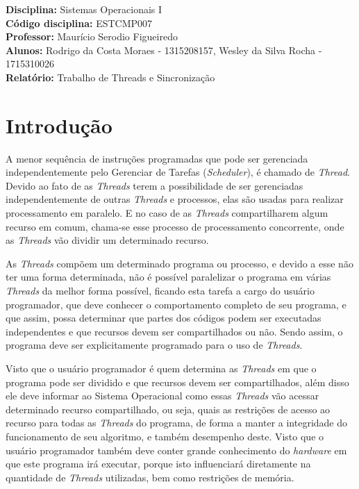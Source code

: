 \documentclass[a4paper, 11pt]{article}
\begin{document}
\noindent
\large\textbf{Disciplina: }Sistemas Operacionais I\\
\normalsize \textbf{Código disciplina: }ESTCMP007 \\
\textbf{Professor: }Maurício Serodio Figueiredo \\
\textbf{Alunos: }Rodrigo da Costa Moraes - 1315208157, Wesley da Silva Rocha - 1715310026 \\
\textbf{Relatório: }\large Trabalho de Threads e Sincronização

\section{Introdução}
A menor sequência de instruções programadas que pode ser gerenciada independentemente pelo Gerenciar de Tarefas (\textit{Scheduler}), é chamado de \textit{Thread}. Devido ao fato de as \textit{Threads} terem a possibilidade de ser gerenciadas independentemente de outras \textit{Threads} e processos, elas são usadas para realizar processamento em paralelo. E no caso de as \textit{Threads} compartilharem algum recurso em comum, chama-se esse processo de processamento concorrente, onde as \textit{Threads} vão dividir um determinado recurso.

As \textit{Threads} compõem um determinado programa ou processo, e devido a esse não ter uma forma determinada, não é possível paralelizar o programa em várias \textit{Threads} da melhor forma possível, ficando esta tarefa a cargo do usuário programador, que deve conhecer o comportamento completo de seu programa, e que assim, possa determinar que partes dos códigos podem ser executadas independentes e que recursos devem ser compartilhados ou não. Sendo assim, o programa deve ser explicitamente programado para o uso de \textit{Threads}.

Visto que o usuário programador é quem determina as \textit{Threads} em que o programa pode ser dividido e que recursos devem ser compartilhados, além disso ele deve informar ao Sistema Operacional como essas \textit{Threads} vão acessar determinado recurso compartilhado, ou seja, quais as restrições de acesso ao recurso para todas as \textit{Threads} do programa, de forma a manter a integridade do funcionamento de seu algoritmo, e também desempenho deste. Visto que o usuário programador também deve conter grande conhecimento do \textit{hardware} em que este programa irá executar, porque isto influenciará diretamente na quantidade de \textit{Threads} utilizadas, bem como restrições de memória.
\end{document}
